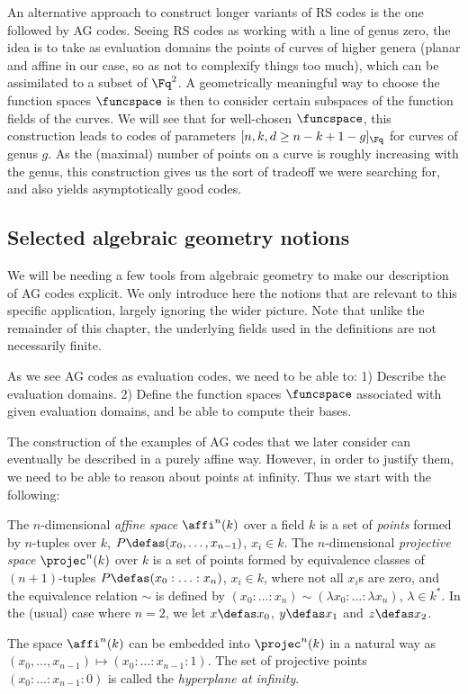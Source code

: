 An alternative approach to construct longer variants of RS codes is the one followed by AG codes. Seeing
RS codes as working with a line of genus zero, the idea is to take as evaluation domains
the points of curves of higher genera (planar and affine in our case, so as not to complexify things too much),
which can be assimilated to a subset of $\Fq^2$. A geometrically
meaningful way to choose the function spaces $\funcspace$ is then to consider certain subspaces of
the function fields of the curves. We will see that for well-chosen $\funcspace$, this construction
leads to codes of parameters $[n, k, d \geq n - k + 1 - g]_{\Fq}$ for curves of genus $g$. As the
(maximal) number of points on a curve is roughly increasing with the genus, this construction gives us the
sort of tradeoff we were searching for, and also yields asymptotically good codes.

\subsection{Selected algebraic geometry notions}

We will be needing a few tools from algebraic geometry to make our description of AG codes explicit. We only introduce
here the notions that are relevant to this specific application,
largely ignoring the wider picture. Note that unlike the remainder of this chapter, the underlying fields used in the definitions
are not necessarily finite.

As we see AG codes as evaluation codes, we need to be able to: 1) Describe the evaluation domains.
2) Define the function spaces $\funcspace$ associated with given evaluation domains,
and be able to compute their bases.

\medskip

The construction of the examples of AG codes that we later consider can eventually be described in a purely affine way. However, in order to
justify them, we need to be able to reason about points at infinity. Thus we start with the following:

\begin{defi}
\label{def:affiprojec}
The $n$-dimensional \emph{affine space} $\affi^n(k)$ over a field $k$ is a set of \emph{points} formed by $n$-tuples over $k$,
$P \defas (x_0, \ldots, x_{n-1})$, $x_i \in k$.
The $n$-dimensional \emph{projective space} $\projec^n(k)$ over $k$ is a set of points formed by equivalence classes of $(n+1)$-tuples
$P \defas (x_0 : \ldots : x_n)$, $x_i \in k$, where not all $x_i$s are zero, and the equivalence relation $\sim$ is
defined by $(x_0 : \ldots : x_n) \sim (\lambda x_0 : \ldots : \lambda x_n)$, $\lambda \in k^*$. In the (usual) case where $n = 2$, we let
$x \defas x_0$, $y \defas x_1$ and $z \defas x_2$.

\noindent
The space $\affi^n(k)$ can be embedded into $\projec^n(k)$ in a natural way as $(x_0, \ldots, x_{n-1}) \mapsto (x_0 : \ldots : x_{n-1} : 1)$.
The set of projective points $(x_0 : \ldots : x_{n-1} : 0)$ is called the \emph{hyperplane at infinity}.
\end{defi}

